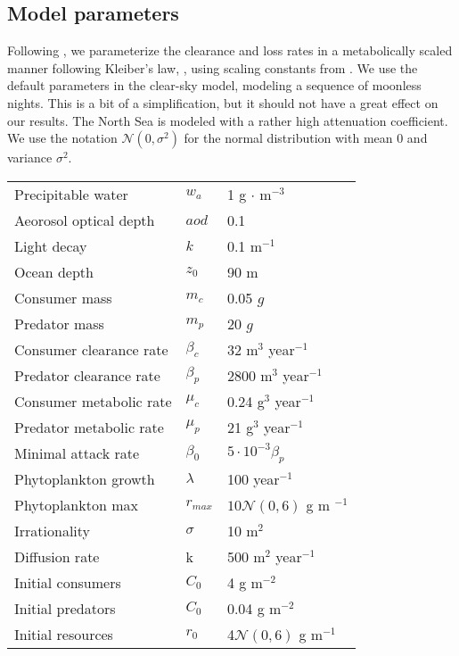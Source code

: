 \subsection{Model parameters}
Following \citep{yodzis1992body}, we parameterize the clearance and loss rates in a metabolically scaled manner following Kleiber's law, \citep{yodzis1992body}, using scaling constants from \citep{kha_2019}. We use the default parameters in the clear-sky model, modeling a sequence of moonless nights. This is a bit of a simplification, but it should not have a great effect on our results. The North Sea is modeled with a rather high attenuation coefficient. We use the notation $\mathcal{N}(0,\sigma^2)$ for the normal distribution with mean $0$ and variance $\sigma^2$.


\begin{tabular}{l  l  l}
  Precipitable water & $w_a$ & 1 g $\cdot$ m$^{-3}$\\
  Aeorosol optical depth & $aod$ & 0.1 \\
  Light decay & $k$ & 0.1 m$^{-1}$\\
  Ocean depth & $z_0$ & 90 m \\
  Consumer mass & $m_c$ & 0.05 $g$ \\
  Predator mass & $m_p$ & 20 $g$ \\
  Consumer clearance rate & $\beta_c$ & 32 m$^{3}$ year$^{-1}$ \\
  Predator clearance rate & $\beta_p$ & 2800 m$^3$ year$^{-1}$ \\
  Consumer metabolic rate & $\mu_c$ & 0.24 g$^{3}$ year$^{-1}$ \\
  Predator metabolic rate & $\mu_p$ & 21 g$^3$ year$^{-1}$ \\
  Minimal attack rate & $\beta_0$ & $5 \cdot 10^{-3} \beta_p$ \\
  Phytoplankton growth & $\lambda$ & 100 year$^{-1}$ \\
  Phytoplankton max & $r_{max}$ & $10\mathcal{N}(0,6)$ g m $^{-1}$ \\
  Irrationality & $\sigma$ & 10 m$^2$ \\
  Diffusion rate & k & 500 m$^{2}$ year$^{-1}$ \\
  Initial consumers & $C_0$ & 4  g m$^{-2}$ \\
  Initial predators & $C_0$ & 0.04  g m$^{-2}$ \\
  Initial resources & $r_0$ & 4$\mathcal{N}(0,6)$ g m$^{-1}$
\end{tabular}

